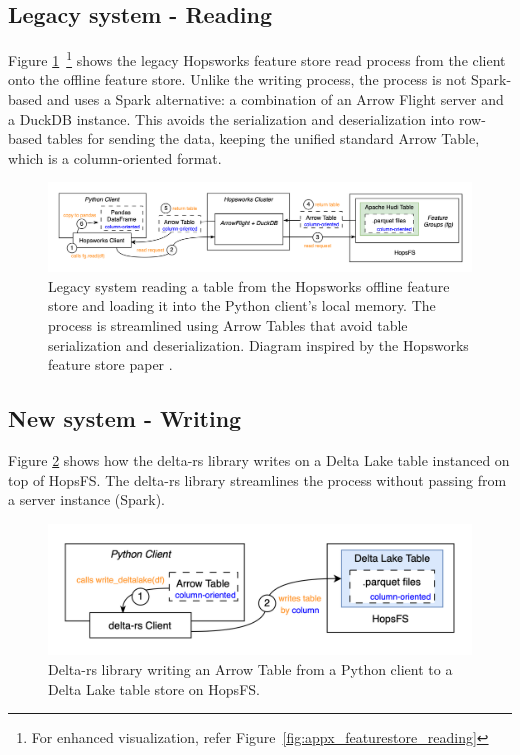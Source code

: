 \subsection{Legacy system - Reading}
\label{subsec:legacy_sys_reading}

Figure \ref{fig:featurestore_reading}~\footnote{For enhanced visualization, refer Figure~\ref{fig:appx_featurestore_reading}} shows the legacy Hopsworks feature store read process from the client onto the offline feature store. Unlike the writing process, the process is not Spark-based and uses a Spark alternative: a combination of an Arrow Flight server and a DuckDB instance. This avoids the serialization and deserialization into row-based tables for sending the data, keeping the unified standard Arrow Table, which is a column-oriented format.

\begin{figure}
    \begin{center}
      \includegraphics[width=\textwidth]{figures/2-background/FeatureStore-reading.png}
    \end{center}
    \caption[Legacy system - Read process]{Legacy system reading a table from the Hopsworks offline feature store and loading it into the Python client's local memory. The process is streamlined using Arrow Tables that avoid table serialization and deserialization. Diagram inspired by the Hopsworks feature store paper \cite{10.1145/3626246.3653389}.}
    \label{fig:featurestore_reading}
\end{figure}

\subsection{New system - Writing}

Figure \ref{fig:delta_rs_writing} shows how the delta-rs library writes on a Delta Lake table instanced on top of \gls{HopsFS}. The delta-rs library streamlines the process without passing from a server instance (Spark).

\begin{figure}
    \begin{center}
      \includegraphics[width=\textwidth]{figures/2-background/delta-rs_writing.png}
    \end{center}
    \caption[Delta-rs library - Write process]{Delta-rs library writing an Arrow Table from a Python client to a Delta Lake table store on \gls{HopsFS}.}
    \label{fig:delta_rs_writing}
\end{figure}


